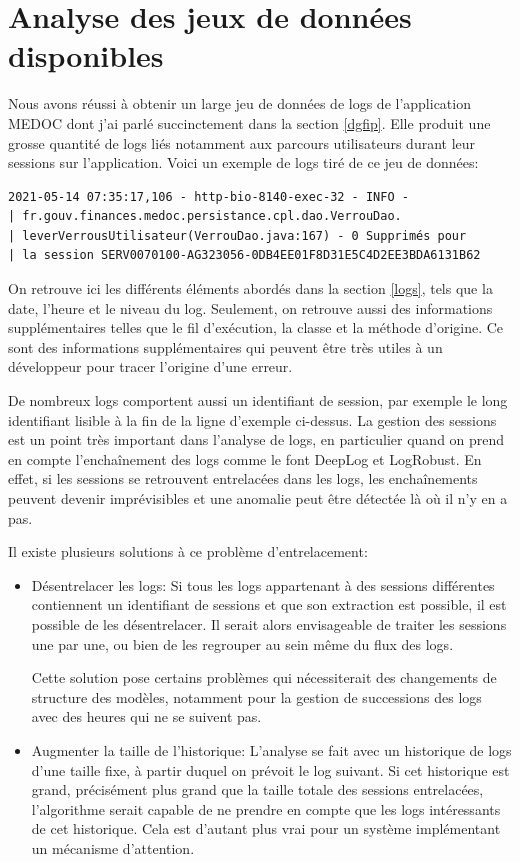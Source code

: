 \documentclass[openany, 11pt]{memoir}
\begin{document}
\section{Analyse des jeux de données disponibles}

Nous avons réussi à obtenir un large jeu de données de \glspl{log} de l'application \gls{MEDOC} dont j'ai parlé succinctement dans la section \ref{dgfip}. Elle produit une grosse quantité de logs liés notamment aux parcours utilisateurs durant leur sessions sur l'application. Voici un exemple de logs tiré de ce jeu de données:

\begin{lstlisting}
2021-05-14 07:35:17,106 - http-bio-8140-exec-32 - INFO -
| fr.gouv.finances.medoc.persistance.cpl.dao.VerrouDao.
| leverVerrousUtilisateur(VerrouDao.java:167) - 0 Supprimés pour
| la session SERV0070100-AG323056-0DB4EE01F8D31E5C4D2EE3BDA6131B62
\end{lstlisting}

On retrouve ici les différents éléments abordés dans la section \ref{logs}, tels que la date, l'heure et le niveau du \gls{log}. Seulement, on retrouve aussi des informations supplémentaires telles que le fil d'exécution, la classe et la méthode d'origine. Ce sont des informations supplémentaires qui peuvent être très utiles à un développeur pour tracer l'origine d'une erreur.

\bigskip
De nombreux \glspl{log} comportent aussi un identifiant de session, par exemple le long identifiant lisible à la fin de la ligne d'exemple ci-dessus. La gestion des sessions est un point très important dans l'analyse de logs, en particulier quand on prend en compte l'enchaînement des logs comme le font DeepLog et LogRobust. En effet, si les sessions se retrouvent entrelacées dans les logs, les enchaînements peuvent devenir imprévisibles et une anomalie peut être détectée là où il n'y en a pas.

Il existe plusieurs solutions à ce problème d'entrelacement:
\begin{itemize}
	\item Désentrelacer les \glspl{log}: Si tous les logs appartenant à des sessions différentes contiennent un identifiant de sessions et que son extraction est possible, il est possible de les désentrelacer. Il serait alors envisageable de traiter les sessions une par une, ou bien de les regrouper au sein même du flux des logs.

Cette solution pose certains problèmes qui nécessiterait des changements de structure des modèles, notamment pour la gestion de successions des \glspl{log} avec des heures qui ne se suivent pas.

	\item Augmenter la taille de l'historique: L'analyse se fait avec un historique de \glspl{log} d'une taille fixe, à partir duquel on prévoit le log suivant. Si cet historique est grand, précisément plus grand que la taille totale des sessions entrelacées, l'algorithme serait capable de ne prendre en compte que les logs intéressants de cet historique. Cela est d'autant plus vrai pour un système implémentant un mécanisme d'attention.
\end{itemize}
\end{document}
